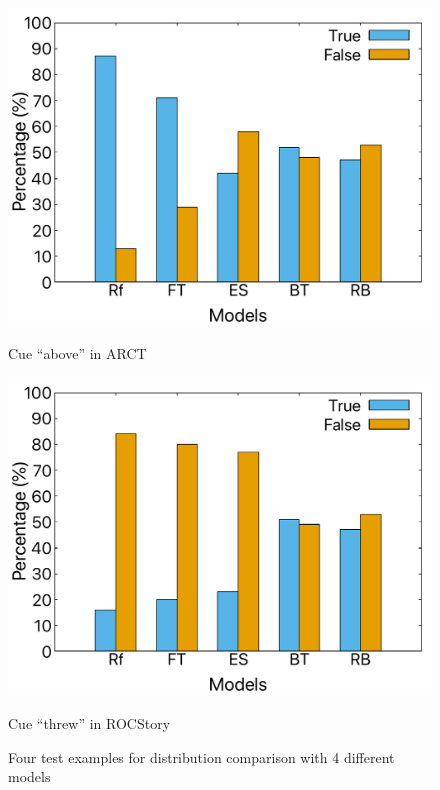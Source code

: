 \begin{figure}[th]
\begin{minipage}[b]{0.40\linewidth}
\centering
\includegraphics[width=\columnwidth]{picture/above-arct.pdf}
\caption*{Cue ``above'' in ARCT} 
\label{fig:cue_above} 
\end{minipage}
\hspace{0.5cm} 
\begin{minipage}[b]{0.40\linewidth} 
\centering 
\includegraphics[width=\columnwidth]{picture/threw-roc.pdf} 
\caption*{Cue ``threw'' in ROCStory}
\label{fig:cue_threw}
\end{minipage}
\caption{Four test examples for distribution comparison with 4 different models}
\label{fig:cue_result}
\end{figure}


